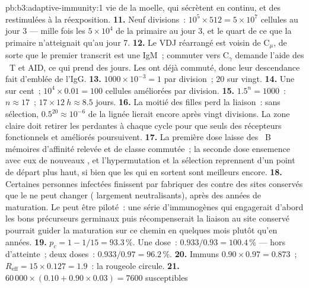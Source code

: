 \begin{solution}{pb:b3:adaptive-immunity:1}
vie de la moelle, qui sécrètent en continu, et des 
restimulées à la réexposition.
\textbf{11.} Neuf divisions~: $10^{5}\times 512 = 5\times 10^{7}$ cellules
au jour 3 --- mille fois les $5\times 10^{4}$ de la primaire au jour 3,
et le quart de ce que la primaire n'atteignait qu'au jour 7.
\textbf{12.} Le VDJ réarrangé est voisin de C$_{\mu}$, de sorte que le
premier transcrit est une IgM~; commuter vers C$_{\gamma}$ demande
l'aide des ~T et AID, ce qui prend des jours. Les  ont déjà commuté, donc leur descendance fait d'emblée de l'IgG.
\textbf{13.} $1000\times 10^{-3} = 1$ par division~; $20$ sur vingt.
\textbf{14.} Une sur cent~; $10^{4}\times 0.01 = 100$ cellules améliorées
par division.
\textbf{15.} $1.5^{n} = 1000$~: $n \approx 17$~; $17\times \qty{12}{h}
\approx 8.5$ jours.
\textbf{16.} La moitié des filles perd la liaison~: sans sélection, $0.5^{20}
\approx 10^{-6}$ de la lignée lierait encore après vingt divisions. La
zone claire doit retirer les perdantes à chaque cycle pour que seuls des
récepteurs fonctionnels et améliorés poursuivent.
\textbf{17.} La première dose laisse des ~B mémoires
d'affinité relevée et de classe commutée~; la seconde dose ensemence
avec eux de nouveaux , et l'hypermutation et la
sélection reprennent d'un point de départ plus haut, si bien que les
 qui en sortent sont meilleurs encore.
\textbf{18.} Certaines personnes infectées finissent par fabriquer des
 contre des sites conservés que le  ne peut changer
( largement neutralisants), après des années de maturation. Le
 peut être piloté~: une série d'immunogènes qui
engagerait d'abord les bons précurseurs germinaux puis récompenserait la
liaison au site conservé pourrait guider la maturation sur ce chemin en
quelques mois plutôt qu'en années.
\textbf{19.} $p_{c} = 1 - 1/15 = 93.3\,\%$. Une dose~: $0.933/0.93 =
100.4\,\%$ --- hors d'atteinte~; deux doses~: $0.933/0.97 = 96.2\,\%$.
\textbf{20.} Immuns $0.90\times 0.97 = 0.873$~; $R_{\text{eff}} = 15\times
0.127 = 1.9$~: la rougeole circule.
\textbf{21.} $60\,000\times (0.10 + 0.90\times 0.03) = 7600$ susceptibles

\end{solution}
